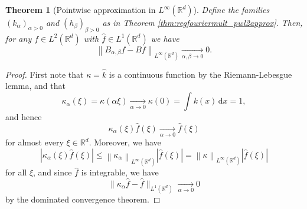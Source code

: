 \documentclass{article}
\newtheorem{theorem}{Theorem}[section]
\theoremstyle{definition}
\newcommand{\R}{\mathbb{R}}
\newcommand{\di}{\,\mathrm{d}}
\newcommand{\smallnorm}[1]{\lVert#1\rVert}
\newcommand{\norm}[1]{\left\lVert#1\right\rVert}
\newcommand{\abs}[1]{\left\lvert#1\right\rvert}
\newcommand{\fhat}[1]{\widehat{#1}}
\begin{document}
\begin{theorem}[Pointwise approximation in \(L^\infty(\R^d)\)]
\label{thm:regfouriermult_pwuniformapprox}
    Define the families \((k_\alpha)_{\alpha>0}\) and \((h_\beta)_{\beta>0}\) as in Theorem \ref{thm:regfouriermult_pwl2approx}.
    Then, for any \(f\in L^2(\R^d)\) with \(\fhat{f}\in L^1(\R^d)\) we have
    \begin{equation*}
        \norm{B_{\alpha,\beta}f - Bf}_{L^\infty(\R^d)}\xrightarrow[\alpha,\beta\to 0]{} 0.
    \end{equation*}
\end{theorem}
\begin{proof}
    First note that \(\kappa = \fhat{k}\) is a continuous function by the Riemann-Lebesgue lemma, and that
    \begin{equation*}
        \kappa_\alpha(\xi)
        = \kappa (\alpha\xi)
        \xrightarrow[\alpha\to 0]{}
        \kappa(0)
        = \int k(x)\di x = 1,
    \end{equation*}
    and hence
    \begin{equation*}
        \kappa_\alpha(\xi)\fhat{f}(\xi)
        \xrightarrow[\alpha\to 0]{} \fhat{f}(\xi)
    \end{equation*}
    for almost every \(\xi\in\R^d\).
    Moreover, we have
    \begin{equation*}
        \abs{\kappa_\alpha(\xi)\fhat{f}(\xi)}
        \leq
        \norm{\kappa_\alpha}_{L^\infty(\R^d)}
        \abs{\fhat{f}(\xi)}
        =
        \norm{\kappa}_{L^\infty(\R^d)}
        \abs{\fhat{f}(\xi)}
    \end{equation*}
    for all \(\xi\),
    and since \(\fhat{f}\) is integrable,
    we have
    \begin{equation*}
        \smallnorm{\kappa_\alpha \fhat{f} - \fhat{f}}_{L^1(\R^d)}
        \xrightarrow[\alpha\to 0]{}0
    \end{equation*}
    by the dominated convergence theorem.
    

\end{proof}
\end{document}
